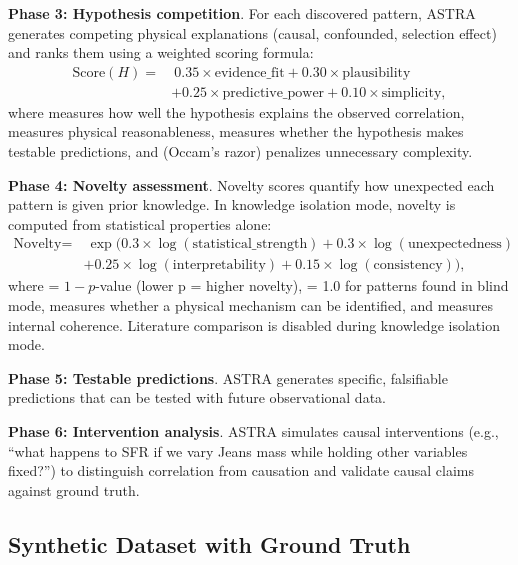 \documentclass[usenatbib]{rasti}
\begin{document}
\noindent\textbf{Phase 3: Hypothesis competition}. For each discovered pattern, ASTRA generates competing physical explanations (causal, confounded, selection effect) and ranks them using a weighted scoring formula:
\begin{equation}
\begin{split}
\text{Score}(H) = &\ 0.35 \times \text{evidence\_fit} + 0.30 \times \text{plausibility} \\
& + 0.25 \times \text{predictive\_power} + 0.10 \times \text{simplicity},
\end{split}
\end{equation}
where  measures how well the hypothesis explains the observed correlation,  measures physical reasonableness,  measures whether the hypothesis makes testable predictions, and  (Occam's razor) penalizes unnecessary complexity.

\noindent\textbf{Phase 4: Novelty assessment}. Novelty scores quantify how unexpected each pattern is given prior knowledge. In knowledge isolation mode, novelty is computed from statistical properties alone:
\begin{equation}
\begin{split}
\text{Novelty} = &\ \exp(0.3 \times \log(\text{statistical\_strength}) + 0.3 \times \log(\text{unexpectedness}) \\
& + 0.25 \times \log(\text{interpretability}) + 0.15 \times \log(\text{consistency})),
\end{split}
\end{equation}
where  = $1 - p$-value (lower p = higher novelty),  = 1.0 for patterns found in blind mode,  measures whether a physical mechanism can be identified, and  measures internal coherence. Literature comparison is disabled during knowledge isolation mode.

\noindent\textbf{Phase 5: Testable predictions}. ASTRA generates specific, falsifiable predictions that can be tested with future observational data.

\noindent\textbf{Phase 6: Intervention analysis}. ASTRA simulates causal interventions (e.g., ``what happens to SFR if we vary Jeans mass while holding other variables fixed?'') to distinguish correlation from causation and validate causal claims against ground truth.

\subsection{Synthetic Dataset with Ground Truth}
\end{document}
